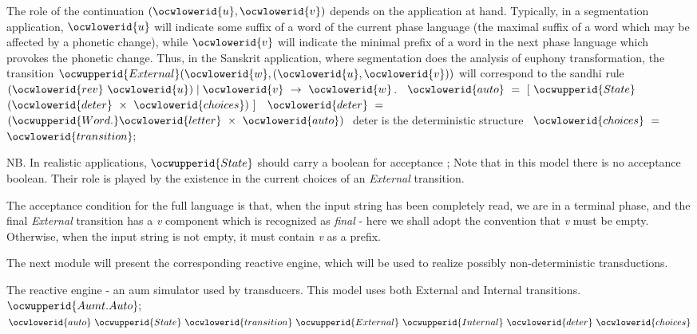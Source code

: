 \documentclass[12pt]{article}
\begin{document}
   The role of the continuation \ocwbegindcode{}$(\ocwlowerid{u},\ocwlowerid{v})$\ocwenddcode{} depends on the application at hand. 
   Typically, in a segmentation application, \ocwbegindcode{}$\ocwlowerid{u}$\ocwenddcode{} will indicate some suffix 
   of a word of the current phase language (the maximal suffix of a word 
   which may be affected by a phonetic change), while \ocwbegindcode{}$\ocwlowerid{v}$\ocwenddcode{} will indicate the 
   minimal prefix of a word in the next phase language which provokes the 
   phonetic change. Thus, in the Sanskrit application, where segmentation
   does the analysis of euphony transformation, the transition
   \ocwbegindcode{}$\ocwupperid{External}(\ocwlowerid{w},(\ocwlowerid{u},\ocwlowerid{v}))$\ocwenddcode{} will correspond to the sandhi rule \ocwbegindcode{}$(\ocwlowerid{rev}~\ocwlowerid{u})\mid{}\ocwlowerid{v}~\rightarrow{}~\ocwlowerid{w}$\ocwenddcode{}. 
\ocweol
\label{../ML/aumt.mli:1834}%
\medskip
\ocwbegincode{}\ocwindent{0.00em}
~$\ocwlowerid{auto}~=~[~\ocwupperid{State}~$~$(\ocwlowerid{deter}~\times{}~\ocwlowerid{choices})~]$\ocweol
\ocwindent{0.00em}
~$\ocwlowerid{deter}~=~$~$(\ocwupperid{Word.}\ocwlowerid{letter}~\times{}~\ocwlowerid{auto})~$\ocweol
\ocwindent{1.50em}
\ocwbc{} deter is the deterministic structure \ocwec{}\ocweol
\ocwindent{0.00em}
~$\ocwlowerid{choices}~=~$~$\ocwlowerid{transition};$\medskip

\ocwendcode{}\ocwindent{0.00em}
NB. In realistic applications, \ocwbegindcode{}$\ocwupperid{State}$\ocwenddcode{} should carry a boolean for acceptance 
\ocweol
\label{../ML/aumt.mli:2078}%
\medskip
\ocwbegincode{}\ocwindent{0.00em}
\ocweol
\ocwindent{0.00em}
;\ocweol
\ocwendcode{}Note that in this model there is no acceptance boolean. Their role is played by the existence
in the current choices of an {\sl External} transition.

The acceptance condition for the full language is that, when the input string has been 
completely read, we are in a terminal phase, and the final {\sl External} transition has
a {\sl v} component which is recognized as {\sl final} - here we shall adopt the convention
that {\sl v} must be empty. Otherwise, when the input string is not empty, it must
contain {\sl v} as a prefix. 

The next module will present the corresponding reactive engine,
which will be used to realize possibly non-deterministic transductions.

\label{../ML/reactt.ml:0}%
The reactive engine - an aum simulator used by transducers. 
\ocweol
\ocwindent{0.00em}
This model uses both External and Internal transitions.  
\ocweol
\label{../ML/reactt.ml:747}%
\medskip
\ocwbegincode{}\ocwindent{0.00em}
~$\ocwupperid{Aumt.Auto};~$\ocwbc{} \ocwbegindcode{}$\ocwlowerid{auto}~\ocwupperid{State}~\ocwlowerid{transition}~\ocwupperid{External}~\ocwupperid{Internal}~\ocwlowerid{deter}~\ocwlowerid{choices}$\ocwenddcode{} \ocwec{}\medskip
\end{document}
